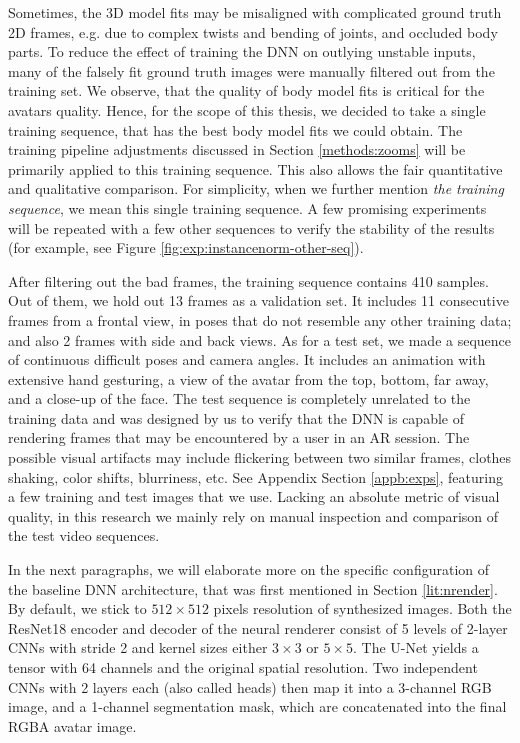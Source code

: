 Sometimes, the 3D model fits may be misaligned with complicated ground truth 2D frames, e.g. due to complex twists and bending of joints, and occluded body parts. To reduce the effect of training the DNN on outlying unstable inputs, many of the falsely fit ground truth images were manually filtered out from the training set. We observe, that the quality of body model fits is critical for the avatars quality. Hence, for the scope of this thesis, we decided to take a single training sequence, that has the best body model fits we could obtain. The training pipeline adjustments discussed in Section \ref{methods:zooms} will be primarily applied to this training sequence. This also allows the fair quantitative and qualitative comparison. For simplicity, when we further mention \textit{the training sequence}, we mean this single training sequence. A few promising experiments will be repeated with a few other sequences to verify the stability of the results (for example, see Figure \ref{fig:exp:instancenorm-other-seq}). 

After filtering out the bad frames, the training sequence contains 410 samples. Out of them, we hold out 13 frames as a validation set. It includes 11 consecutive frames from a frontal view, in poses that do not resemble any other training data; and also 2 frames with side and back views. As for a test set, we made a sequence of continuous difficult poses and camera angles. It includes an animation with extensive hand gesturing, a view of the avatar from the top, bottom, far away, and a close-up of the face. The test sequence is completely unrelated to the training data and was designed by us to verify that the DNN is capable of rendering frames that may be encountered by a user in an AR session. The possible visual artifacts may include flickering between two similar frames, clothes shaking, color shifts, blurriness, etc. See Appendix Section \ref{appb:exps}, featuring a few training and test images that we use. Lacking an absolute metric of visual quality, in this research we mainly rely on manual inspection and comparison of the test video sequences. 

In the next paragraphs, we will elaborate more on the specific configuration of the baseline DNN architecture, that was first mentioned in Section \ref{lit:nrender}. By default, we stick to $512\times512$ pixels resolution of synthesized images. Both the ResNet18 encoder and decoder of the neural renderer consist of 5 levels of 2-layer CNNs with stride 2 and kernel sizes either $3\times3$ or $5\times5$. The U-Net yields a tensor with 64 channels and the original spatial resolution. Two independent CNNs with 2 layers each (also called heads) then map it into a 3-channel RGB image, and a 1-channel segmentation mask, which are concatenated into the final RGBA avatar image.

